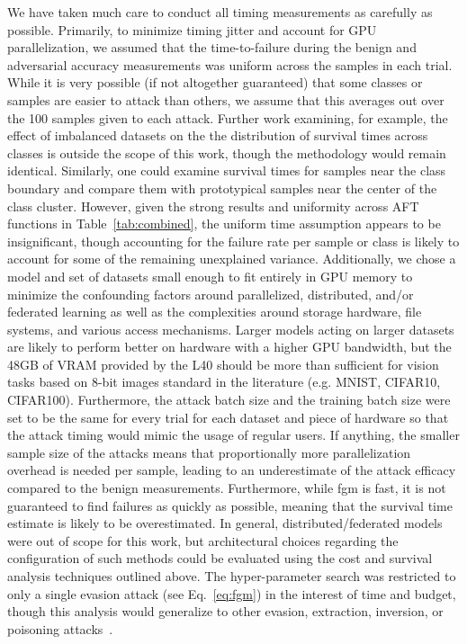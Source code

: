 \documentclass[sn-mathphys-num]{sn-jnl}%
\begin{document}
We have taken much care to conduct all timing measurements as carefully as possible.
Primarily, to minimize timing jitter and account for GPU parallelization, we assumed that the time-to-failure during the benign and adversarial accuracy measurements was uniform across the samples in each trial. 
While it is very possible (if not altogether guaranteed) that some classes or samples are easier to attack than others, we assume that this averages out over the 100 samples given to each attack. Further work examining, for example, the effect of imbalanced datasets on the the distribution of survival times across classes is outside the scope of this work, though the methodology would remain identical. Similarly, one could examine survival times for samples near the class boundary and compare them with prototypical samples near the center of the class cluster. 
However, given the strong results and uniformity across AFT functions in Table~\ref{tab:combined}, the uniform time assumption appears to be insignificant, though accounting for the failure rate per sample or class is likely to account for some of the remaining unexplained variance. 
Additionally, we chose a model and set of datasets small enough to fit entirely in GPU memory to minimize the confounding factors around parallelized, distributed, and/or federated learning as well as the complexities around storage hardware, file systems, and various access mechanisms. 
Larger models acting on larger datasets are likely to perform better on hardware with a higher GPU bandwidth, but the 48GB of VRAM provided by the L40 should be more than sufficient for vision tasks based on 8-bit images standard in the literature (e.g. MNIST, CIFAR10, CIFAR100). Furthermore, the attack batch size and the training batch size were set to be the same for every trial for each dataset and piece of hardware so that the attack timing would mimic the usage of regular users.
If anything, the smaller sample size of the attacks means that proportionally more parallelization overhead is needed per sample, leading to an underestimate of the attack efficacy compared to the benign measurements. Furthermore, while \acrshort{fgm} is fast, it is not guaranteed to find failures as quickly as possible, meaning that the survival time estimate is likely to be overestimated.
In general, distributed/federated models were out of scope for this work, but architectural choices regarding the configuration of such methods could be evaluated using the cost and survival analysis techniques outlined above. 
The hyper-parameter search was restricted to only a single evasion attack (see Eq.~\ref{eq:fgm}) in the interest of time and budget, though this analysis would generalize to other evasion, extraction, inversion, or poisoning attacks~\cite{biggio_evasion_2013,biggio_poisoning_2013,choquette2021label,orekondy2019knockoff}. 
\end{document}
